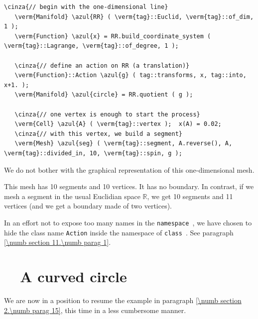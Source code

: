 \begin{Verbatim}[commandchars=\\\{\},formatcom=\small\tt,frame=single,
   label=parag-\ref{\numb section 7.\numb parag 2}.cpp,rulecolor=\color{coment},
   baselinestretch=0.94,framesep=2mm                                            ]
   \cinza{// begin with the one-dimensional line}
   \verm{Manifold} \azul{RR} ( \verm{tag}::Euclid, \verm{tag}::of_dim, 1 );
   \verm{Function} \azul{x} = RR.build_coordinate_system ( \verm{tag}::Lagrange, \verm{tag}::of_degree, 1 );

   \cinza{// define an action on RR (a translation)}
   \verm{Function}::Action \azul{g} ( tag::transforms, x, tag::into, x+1. );
   \verm{Manifold} \azul{circle} = RR.quotient ( g );

   \cinza{// one vertex is enough to start the process}
   \verm{Cell} \azul{A} ( \verm{tag}::vertex );  x(A) = 0.02;
   \cinza{// with this vertex, we build a segment}
   \verm{Mesh} \azul{seg} ( \verm{tag}::segment, A.reverse(), A, \verm{tag}::divided_in, 10, \verm{tag}::spin, g );
\end{Verbatim}

We do not bother with the graphical representation of this one-dimensional mesh.

This mesh has 10 segments and 10 vertices. It has no boundary.
In contrast, if we mesh a segment in the usual Euclidian space $ \mathbb{R} $,
we get 10 segments and 11 vertices (and we get a boundary made of two vertices).

In an effort not to expose too many names in the {\small\tt namespace },
we have chosen to hide the class name {\small\tt Action} inside the namespace of
{\small\tt class }.
See paragraph \ref{\numb section 11.\numb parag 1}.


\section{~~A curved circle}\label{\numb section 7.\numb parag 2}

We are now in a position to resume the example in paragraph \ref{\numb section 2.\numb parag 15},
this time in a less cumbersome manner.


